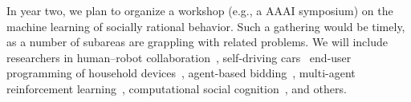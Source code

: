 In year two, we plan to organize a workshop (e.g., a AAAI symposium)
on the machine learning of socially rational behavior. Such a
gathering would be timely, as a number of subareas are grappling with
related problems. We will include researchers in human--robot
collaboration~\cite{gopalan15}, 
self-driving cars~\cite{dolgov2010path}
end-user
programming of household devices~\cite{ur14}, agent-based
bidding~\cite{tac:book}, multi-agent reinforcement
learning~\cite{sodomka13}, computational social
cognition~\cite{baker14}, and others.

